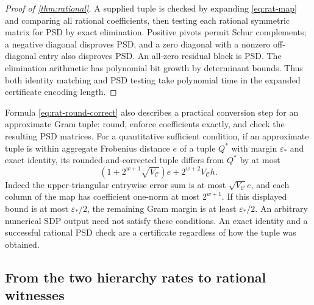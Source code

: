 \begin{proof}[Proof of \cref{thm:rational}]
A supplied tuple is checked by expanding \eqref{eq:rat-map} and comparing
all rational coefficients, then testing each rational symmetric matrix
for PSD by exact elimination. Positive pivots permit Schur complements;
a negative diagonal disproves PSD, and a zero diagonal with a nonzero
off-diagonal entry also disproves PSD. An all-zero residual block is PSD.
The elimination arithmetic has polynomial bit growth by determinant
bounds. Thus both identity matching and PSD testing take polynomial time
in the expanded certificate encoding length.
\end{proof}

Formula \eqref{eq:rat-round-correct} also describes a practical conversion
step for an approximate Gram tuple: round, enforce coefficients exactly,
and check the resulting PSD matrices. For a quantitative sufficient
condition, if an approximate tuple is within aggregate Frobenius distance
$e$ of a tuple $Q^*$ with margin $\varepsilon_*$ and exact identity, its
rounded-and-corrected tuple differs from $Q^*$ by at most
\[
 (1+2^{w+1}\sqrt{V_{\mathcal C}})e
       +2^{w+2}V_{\mathcal C}h.
\]
Indeed the upper-triangular entrywise error sum is at most
$\sqrt{V_{\mathcal C}}e$, and each column of the map has coefficient
one-norm at most $2^{w+1}$. If this displayed bound is at most
$\varepsilon_*/2$, the remaining Gram margin is at least
$\varepsilon_*/2$. An arbitrary numerical SDP output need not satisfy
these conditions. An exact identity and a successful rational PSD check
are a certificate regardless of how the tuple was obtained.

\subsection{From the two hierarchy rates to rational witnesses}
\label{sec:rat-rates}

